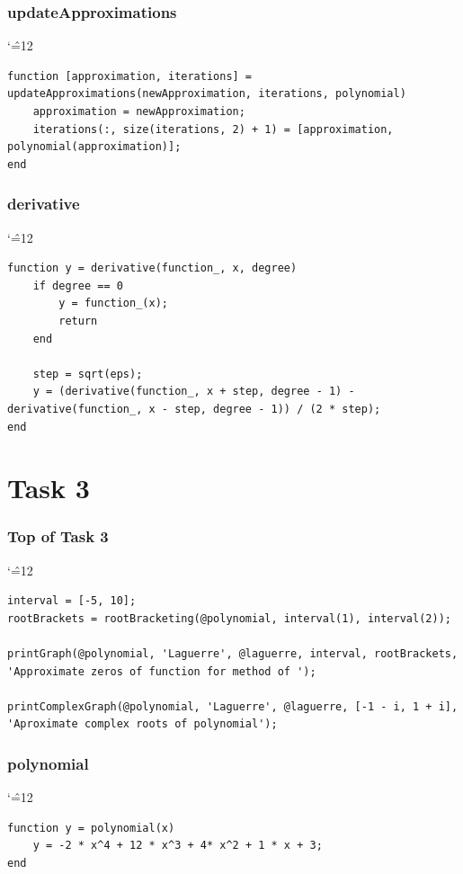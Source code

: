 \documentclass[12pt]{report}
\newenvironment{simplechar}{%
   \catcode`\^=12
}{}
\begin{document}
\subsubsection{updateApproximations}
\begin{simplechar}
\begin{lstlisting}
function [approximation, iterations] = updateApproximations(newApproximation, iterations, polynomial)
    approximation = newApproximation;
    iterations(:, size(iterations, 2) + 1) = [approximation, polynomial(approximation)];
end
\end{lstlisting}
\end{simplechar}

\subsubsection{derivative}
\begin{simplechar}
\begin{lstlisting}
function y = derivative(function_, x, degree)
    if degree == 0
        y = function_(x);
        return
    end

    step = sqrt(eps);
    y = (derivative(function_, x + step, degree - 1) - derivative(function_, x - step, degree - 1)) / (2 * step);
end
\end{lstlisting}
\end{simplechar}

\section{Task 3}

\subsubsection{Top of Task 3}
\begin{simplechar}
\begin{lstlisting}
interval = [-5, 10];
rootBrackets = rootBracketing(@polynomial, interval(1), interval(2));

printGraph(@polynomial, 'Laguerre', @laguerre, interval, rootBrackets, 'Approximate zeros of function for method of ');

printComplexGraph(@polynomial, 'Laguerre', @laguerre, [-1 - i, 1 + i], 'Aproximate complex roots of polynomial');
\end{lstlisting}
\end{simplechar}

\subsubsection{polynomial}
\begin{simplechar}
\begin{lstlisting}
function y = polynomial(x)
    y = -2 * x^4 + 12 * x^3 + 4* x^2 + 1 * x + 3;
end
\end{lstlisting}
\end{simplechar}
\end{document}
